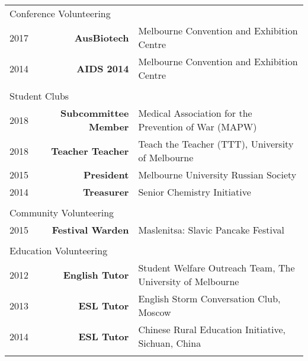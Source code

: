 \documentclass{article}
\begin{document}
\begin{tabularx}{\linewidth}{
							l
							>{\bfseries}r
							X}
	\multicolumn{2}{l}{\large{Conference Volunteering}} \\ \normalsize
		\hspace{0.3cm}	2017 & AusBiotech & Melbourne Convention and Exhibition Centre \\ 
		\hspace{0.3cm}	2014 & AIDS 2014 & Melbourne Convention and Exhibition Centre \\ \\
	\multicolumn{2}{l}{\large{Student Clubs}} \\ \normalsize 
		\hspace{0.3cm} 2018 & Subcommittee Member & Medical Association for the Prevention of War (MAPW) \\
		\hspace{0.3cm} 2018 & Teacher Teacher & Teach the Teacher (TTT), University of Melbourne \\
		\hspace{0.3cm}	2015 & President & Melbourne University Russian Society\\
		\hspace{0.3cm}	2014 & Treasurer & Senior Chemistry Initiative \\ \\
	\multicolumn{2}{l}{\large{Community Volunteering}} \\
		\hspace{0.3cm}	2015 & Festival Warden & Maslenitsa: Slavic Pancake Festival \\	\\
	\multicolumn{2}{l}{\large{Education Volunteering}} \\
		\hspace{0.3cm}	2012 & English Tutor & Student Welfare Outreach Team, The University of Melbourne \\
		\hspace{0.3cm} 2013 & ESL Tutor & English Storm Conversation Club, Moscow \\
		\hspace{0.3cm} 2014 & ESL Tutor & Chinese Rural Education Initiative, Sichuan, China \\ \\
	
\end{tabularx}
\end{document}
